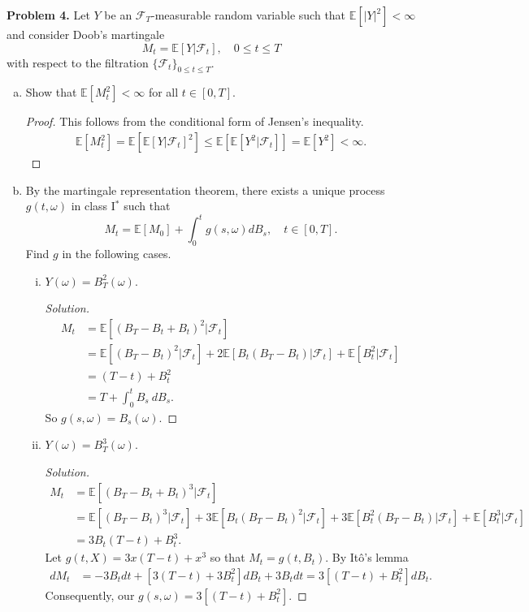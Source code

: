 \documentclass[11pt,letterpaper]{report}
\newcommand{\mcal}[1]{\mathcal{#1}}
\newcommand{\E}{\mathbb{E}}
\newenvironment{solution}
{\begin{proof}[Solution]}
{\end{proof}}
\begin{document}
\noindent\textbf{Problem 4. }
Let $Y$ be an $\mcal{F}_T$-measurable random variable such that $\E[|Y|^2]<\infty$ and consider Doob's martingale
\[
M_t = \E[Y|\mcal{F}_t],\quad 0\leq t\leq T
\]
with respect to the filtration $\{\mcal{F}_t\}_{0\leq t\leq T}$.
\begin{enumerate}[(a)]
	\item Show that $\E[M_t^2]<\infty$ for all $t\in [0, T]$.
	\begin{proof}
		This follows from the conditional form of Jensen's inequality.
		\begin{align*}
			\E[M_t^2]  = \E[\E[Y|\mcal{F}_t]^2] \leq \E[\E[Y^2|\mcal{F}_t]] = \E[Y^2]<\infty.
		\end{align*}
	\end{proof}

	\item By the martingale representation theorem, there exists a unique process $g(t, \omega)$ in class I$^*$ such that
	\[
	M_t = \E[M_0] + \int_0^tg(s, \omega)dB_s,\quad t\in [0,T].
	\]
	Find $g$ in the following cases.
	\begin{enumerate}[(i)]
		\item $Y(\omega) = B^2_T(\omega)$.
		\begin{solution}
			\begin{align*}
				M_t &= \E[(B_T-B_t+B_t)^2|\mcal{F}_t]\\
				&= \E[(B_T-B_t)^2|\mcal{F}_t] + 2\E[B_t(B_T-B_t)|\mcal{F}_t] + \E[B_t^2|\mcal{F}_t]\\
				&= (T-t) + B_t^2\\
				&= T + \int_0^tB_s\ dB_s.
			\end{align*}
			So $g(s, \omega) = B_s(\omega)$.
		\end{solution}

		\item $Y(\omega) = B^3_T(\omega)$.
		\begin{solution}
			\begin{align*}
				M_t &= \E[(B_T-B_t+B_t)^3|\mcal{F}_t]\\
				&= \E[(B_T-B_t)^3|\mcal{F}_t] + 3\E[B_t(B_T-B_t)^2|\mcal{F}_t] + 3\E[B_t^2(B_T-B_t)|\mcal{F}_t] + \E[B_t^3|\mcal{F}_t]\\
				&= 3B_t(T-t) + B_t^3.
			\end{align*}
			Let $g(t, X)= 3x(T-t)+x^3$ so that $M_t = g(t, B_t)$. By It\^o's lemma
			\begin{align*}
				dM_t &= -3B_tdt + [3(T-t)+3B_t^2]dB_t+3B_tdt = 3[(T-t)+B_t^2]dB_t.
			\end{align*}
			Consequently, our $g(s, \omega) = 3[(T-t)+B_t^2]$.
		\end{solution}


\end{enumerate}
\end{enumerate}
\end{document}
